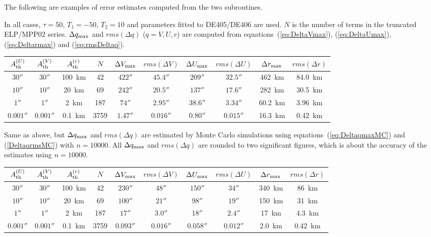 \documentclass[12pt]{article}
\begin{document}
The following are examples of error estimates computed from the two subroutines.

\vskip 0.5cm
In all cases, $\tau=50$, $T_1=-50$, $T_2=10$ and parameters fitted to DE405/DE406 are 
used. $N$ is the 
number of terms in the truncated ELP/MPP02 series. $\Delta q_{\rm max}$ 
and $rms(\Delta q)$ ($q=V,U,r$) are computed from equations~(\ref{eq:DeltaVmax}), 
(\ref{eq:DeltaUmax}), (\ref{eq:Deltarmax}) and (\ref{eq:rmsDeltaq}). 

\begin{tabular}{cccccccccc}
\hline
  $A_{\rm th}^{(U)}$ & $A_{\rm th}^{(V)}$ & $A_{\rm th}^{(r)}$ & $N$ &
  $\Delta V_{\rm max}$ & $rms(\Delta V)$ & $\Delta U_{\rm max}$ & $rms(\Delta U)$
  & $\Delta r_{\rm max}$ & $rms(\Delta r)$ \\
\hline
  $30''$ & $30''$ & 100~km & 42 & $422''$ & $45.4''$ & $209''$ & $32.5''$ & 462~km &
84.0~km \\
  $10''$ & $10''$ & 20~km & 69 & $242''$ & $20.5''$ & $137''$ & $17.6''$ & 282~km &
30.5~km \\
  $1''$ & $1''$ & 2~km & 187 & $74''$ & $2.95''$ & $38.6''$ & $3.34''$ & 60.2~km &
3.96~km \\
  $0.001''$ & $0.001''$ & 0.1~km & 3759 & $1.47''$ & $0.016''$ & $0.80''$ & $0.015''$ &
  16.3~km & 0.42~km \\
\hline
\end{tabular}

\vskip 0.5cm
Same as above, but $\Delta q_{\rm max}$
and $rms(\Delta q)$ are estimated by Monte Carlo simulations using 
equations~(\ref{eq:DeltaqmaxMC}) 
and (\ref{DeltaqrmsMC}) with $n=10000$. All $\Delta q_{\rm max}$ and 
$rms(\Delta q)$ are rounded to two significant figures, which is about the 
accuracy of the estimates using $n=10000$.

\begin{tabular}{cccccccccc}
\hline
  $A_{\rm th}^{(U)}$ & $A_{\rm th}^{(V)}$ & $A_{\rm th}^{(r)}$ & $N$ &
  $\Delta V_{\rm max}$ & $rms(\Delta V)$ & $\Delta U_{\rm max}$ & $rms(\Delta U)$ 
  & $\Delta r_{\rm max}$ & $rms(\Delta r)$ \\
\hline
  $30''$ & $30''$ & 100~km & 42 & $230''$ & $48''$ & $150''$ & $34''$ & 340~km & 
86~km \\
  $10''$ & $10''$ & 20~km & 69 & $100''$ & $21''$ & $98''$ & $19''$ & 150~km & 
31~km \\
  $1''$ & $1''$ & 2~km & 187 & $17''$ & $3.0''$ & $18''$ & $2.4''$ & 17~km & 
4.3~km \\ 
  $0.001''$ & $0.001''$ & 0.1~km & 3759 & $0.093''$ & $0.016''$ & $0.058''$ & $0.012''$ & 
  2.0~km & 0.42~km \\
\hline
\end{tabular}
\end{document}
